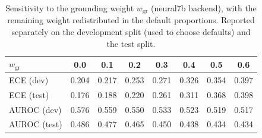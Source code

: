 \begin{table}[t]
  \caption{Sensitivity to the grounding weight $w_{\mathrm{gr}}$ (neural7b backend), with the remaining weight redistributed in the default proportions. Reported separately on the development split (used to choose defaults) and the test split.}
  \label{tab:sweep-neural7b}
  \footnotesize
  \setlength{\tabcolsep}{3pt}
  \begin{tabular}{lccccccc}
    \toprule
    $w_{\mathrm{gr}}$ & 0.0 & 0.1 & 0.2 & 0.3 & 0.4 & 0.5 & 0.6 \\
    \midrule
    ECE (dev) & 0.204 & 0.217 & 0.253 & 0.271 & 0.326 & 0.354 & 0.397 \\
    ECE (test) & 0.176 & 0.188 & 0.220 & 0.261 & 0.311 & 0.368 & 0.398 \\
    AUROC (dev) & 0.576 & 0.559 & 0.550 & 0.533 & 0.523 & 0.519 & 0.517 \\
    AUROC (test) & 0.486 & 0.477 & 0.465 & 0.450 & 0.438 & 0.434 & 0.434 \\
    \bottomrule
  \end{tabular}
\end{table}
